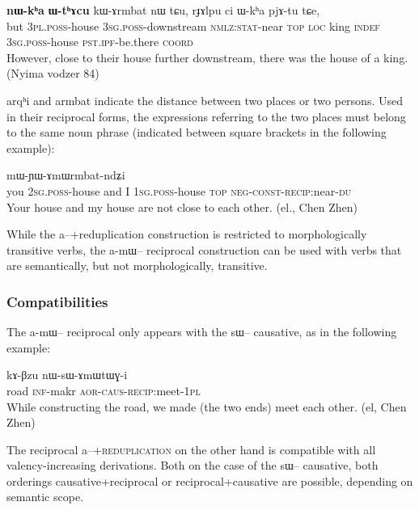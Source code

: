 \documentclass[oldfontcommands,oneside,a4paper,11pt]{memoir}
\newcommand{\ipa}[1]{{\phon #1}} %
\newcommand{\wav}[1]{}%
\newcommand{\aor}{\textsc{aor}}
\newcommand{\caus}{\textsc{caus}}
\newcommand{\coord}{\textsc{coord}}
\newcommand{\const}{\textsc{const}}
\newcommand{\du}{\textsc{du}}
\newcommand{\indef}{\textsc{indef}}
\newcommand{\inftv}{\textsc{inf}}
\newcommand{\ipf}{\textsc{ipf}}
\newcommand{\loc}{\textsc{loc}}
\newcommand{\negat}{\textsc{neg}}
\newcommand{\nmlz}{\textsc{nmlz}}
\newcommand{\pl}{\textsc{pl}}
\newcommand{\poss}{\textsc{poss}}
\newcommand{\pst}{\textsc{pst}}
\newcommand{\sg}{\textsc{sg}}
\newcommand{\stat}{\textsc{stat}}
\newcommand{\topic}{\textsc{top}}
\begin{document}
 \begin{exe}
\ex
\gll   \ipa{tɕeri} 	\textbf{\ipa{nɯ-kʰa} }	\textbf{\ipa{ɯ-tʰɤcu} }	\ipa{kɯ-ɤrmbat} 	\ipa{nɯ} 	\ipa{tɕu,} 	\ipa{rɟɤlpu} 	\ipa{ci} 	\ipa{ɯ-kʰa} 	\ipa{pjɤ-tu} 	\ipa{tɕe,}  \\
  but 3\pl{}.\poss{}-house 3\sg{}.\poss{}-downstream \nmlz{}:\stat{}-near \topic{} \loc{} king \indef{} 3\sg{}.\poss{}-house \pst{}.\ipf{}-be.there \coord{}   \\
 \glt However, close to their house further downstream, there was the house of a king.   (Nyima vodzer 84)
\end{exe}  
  \ipa{arqʰi}  and \ipa{armbat} indicate the distance between two places or two persons. Used in their reciprocal forms, the expressions referring to the two places must belong to the same noun phrase (indicated between square brackets in the following example):
   \begin{exe}
\ex
\gll [\ipa{nɤj} 	\ipa{nɤ-kʰa} 	\ipa{cho} 	\ipa{aʑo} 	\ipa{a-kʰa}] 	\ipa{nɯ} 	\ipa{mɯ-ɲɯ-ɤmɯrmbat-ndʑi}    \\
you 2\sg{}.\poss{}-house  and I 1\sg{}.\poss{}-house \topic{} \negat{}-\const{}-\textsc{recip}:near-\du{} \\
 \glt Your house and my house are not close to each other.  (el., Chen Zhen\wav{amWrmbat})
\end{exe}  

While the  \ipa{a}--+reduplication construction is restricted to morphologically transitive verbs,  the  \ipa{a-mɯ}-- reciprocal construction can  be used with verbs that are semantically, but not morphologically, transitive.

\subsubsection{Compatibilities}  \label{subsub:recip.compat}

The  \ipa{a-mɯ}-- reciprocal only appears with the \ipa{sɯ}-- causative, as in the following example:
  \begin{exe}
\ex
\gll    \ipa{tʂu} 	\ipa{kɤ-βzu} 	\ipa{nɯ-sɯ-ɤmɯtɯɣ-i}   \\
  road \inftv{}-makr \aor{}-\caus{}-\textsc{recip}:meet-1\pl{} \\
 \glt  While constructing the road, we made (the two ends) meet each other. (el, Chen Zhen)
\end{exe}  


The reciprocal \ipa{a}--+\textsc{reduplication} on the other hand is compatible with all valency-increasing derivations. Both on the case of the \ipa{sɯ}-- causative, both orderings causative+reciprocal or reciprocal+causative are possible, depending on semantic scope.
\end{document}
